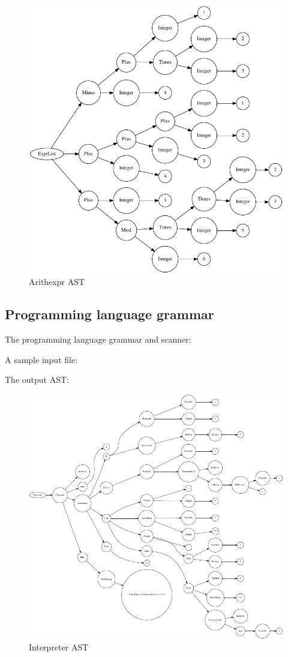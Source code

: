 \begin{figure}
	\centering
		\includegraphics{arith_expr_tree.pdf}
	\caption{Arithexpr AST}
	\label{fig:arith_expr_tree}
\end{figure}

\subsection{Programming language grammar}
The programming language grammar and scanner:

A sample input file:

The output AST:



\begin{figure}
	\centering
		\includegraphics{interpreter_tree.pdf}
	\caption{Interpreter AST}
	\label{fig:interpreter_tree}
\end{figure}

